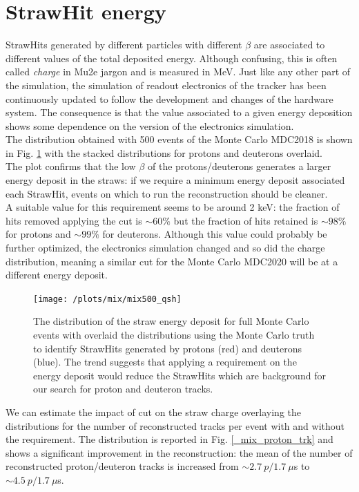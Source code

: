 \documentclass[12pt,a4paper,openright, oneside, titlepage]{book} %
\begin{document}
\section{StrawHit energy}
StrawHits generated by different particles with different $\beta$ 
are associated to different values of the total deposited energy. 
Although confusing, this is often called \textit{charge} in Mu2e jargon and is measured in MeV.
Just like any other part of the simulation, 
the simulation of readout electronics of the tracker has been continuously updated
to follow the development and changes of the hardware system.    
The consequence is that the value associated to a given energy deposition 
shows some dependence on the version of the electronics simulation.\\
The distribution obtained with 500 events of the Monte Carlo MDC2018 is shown 
in Fig. \ref{_mix_proton_qsh} with the stacked distributions for protons and deuterons overlaid.\\ 
The plot confirms that the low $\beta$ of the protons/deuterons generates 
a larger energy deposit in the straws: 
if we require a minimum energy deposit associated each StrawHit, 
events on which to run the reconstruction should be cleaner.\\
A suitable value for this requirement seems to be around 2 keV: 
the fraction of hits removed applying the cut is $\sim 60 \%$ 
but the fraction of hits retained is $\sim 98\%$ for protons and $\sim 99\%$ for deuterons.
Although this value could probably be further optimized, 
the electronics simulation changed and so did the charge distribution, 
meaning a similar cut for the Monte Carlo MDC2020 
will be at a different energy deposit.

\begin{figure}[!htb]
\centering
\texttt{[image: /plots/mix/mix500\_qsh]}
\caption[Straw energy deposit distribution]{The distribution of the straw energy deposit 
for full Monte Carlo events with overlaid the distributions using the Monte Carlo truth 
to identify StrawHits generated by protons (red) and deuterons (blue). 
The trend suggests that applying a requirement on the energy deposit 
would reduce the StrawHits which are background for our search for proton and deuteron tracks.}
\label{_mix_proton_qsh}
\end{figure}

\noindent We can estimate the impact of cut on the straw charge 
overlaying the distributions for the number of reconstructed tracks per event with and without the requirement. 
The distribution is reported in Fig. \ref{_mix_proton_trk} 
and shows a significant improvement in the reconstruction: 
the mean of the number of reconstructed proton/deuteron tracks 
is increased from $\sim2.7\ p/1.7\ \mu$s to $\sim4.5\ p/1.7\ \mu$s.
\end{document}
